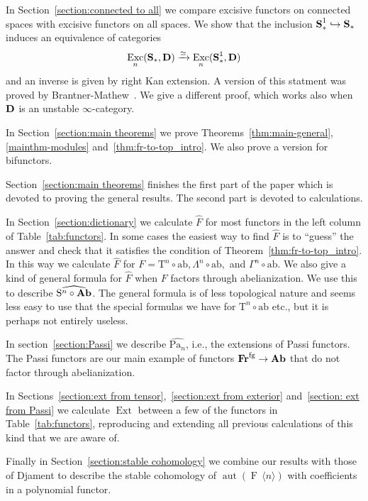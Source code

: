 \documentclass[psamsfonts]{amsart}
\theoremstyle{plain}
\theoremstyle{definition}
\theoremstyle{remark}
\newcommand{\catname}[1]{{\normalfont\textbf{#1}}}
\newcommand{\spaces}{\catname{S}_*}
\newcommand{\connected}{\spaces^{1}}
\newcommand{\fr}{\allfr^{\mathrm{fg}}}
\newcommand{\allfr}{\catname{Fr}}
\newcommand{\ab}{\catname{Ab}}
\newcommand{\aut}{\operatorname{aut}}
\newcommand{\free}[1]{\operatorname{F}\,\langle #1\rangle}
\newcommand{\abelianization}{\mathrm{ab}}
\newcommand{\tensor}{\mathrm{T}}
\newcommand{\symm}{\mathrm{S}}
\newcommand{\Passi}{\mathrm{Pa}}
\DeclareMathOperator{\ext}{Ext}
\DeclareMathOperator{\exc}{Exc}
\begin{document}
In Section~\ref{section:connected to all} we compare excisive functors on connected spaces with excisive functors on all spaces. We show that the inclusion $\connected\hookrightarrow \spaces$ induces an equivalence of categories
\[
\exc_n(\spaces, \catname{D})\xrightarrow{\simeq}\exc_n(\connected, \catname{D})
\]
and an inverse is given by right Kan extension. A version of this statment was proved by Brantner-Mathew~\cite[Theorem 3.36]{Brantner-Mathew}. We give a different proof, which works also when $\catname{D}$ is an unstable $\infty$-category.

In Section~\ref{section:main theorems} we prove Theorems~\ref{thm:main-general}, \ref{mainthm-modules} and~\ref{thm:fr-to-top_intro}. We also prove a version for bifunctors. 

Section~\ref{section:main theorems} finishes the first part of the paper which is devoted to proving the general results. The second part is devoted to calculations.

In Section~\ref{section:dictionary} we calculate $\widehat F$ for most functors in the left column of Table~\ref{tab:functors}. In some cases the easiest way to find $\widehat F$ is to ``guess'' the answer and check that it satisfies the condition of Theorem~\ref{thm:fr-to-top_intro}. In this way we calculate $\widehat F$ for $F=\tensor^n\circ\abelianization, \Lambda^n\circ\abelianization,$ and $\Gamma^n\circ\abelianization$. We also give a kind of general formula for $\widehat F$ when $F$ factors through abelianization. We use this to describe $\widehat{\symm^n\circ \ab}$. The general formula is of less topological nature and seems less easy to use that the special formulas we have for $\tensor^n\circ \abelianization$ etc., but it is perhaps not entirely useless. 

In section~\ref{section:Passi} we describe $\widehat{\Passi_n}$, i.e., the extensions of Passi functors. The Passi functors are our main example of functors $\fr\to\ab$ that do not factor through abelianization.

In Sections~\ref{section:ext from tensor},~\ref{section:ext from exterior} and~\ref{section: ext from Passi} we calculate $\ext$ between a few of the functors in Table~\ref{tab:functors}, reproducing and extending all previous calculations of this kind that we are aware of. %

Finally in Section~\ref{section:stable cohomology} we combine our results with those of Djament to describe the stable cohomology of $\aut(\free{n})$ with coefficients in a polynomial functor.
\end{document}
